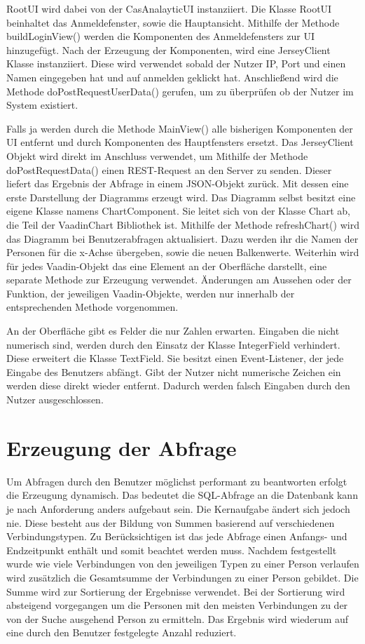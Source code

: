 RootUI wird dabei von der CasAnalayticUI instanziiert. Die Klasse RootUI beinhaltet das Anmeldefenster, sowie die Hauptansicht. Mithilfe der Methode buildLoginView() werden die Komponenten des Anmeldefensters zur UI hinzugefügt. Nach der Erzeugung der Komponenten, wird eine JerseyClient Klasse instanziiert. Diese wird verwendet sobald der Nutzer IP, Port und einen Namen eingegeben hat und auf anmelden geklickt hat. Anschließend wird die Methode doPostRequestUserData() gerufen, um zu überprüfen ob der Nutzer im System existiert. 

Falls ja werden durch die Methode MainView() alle bisherigen Komponenten der UI entfernt und durch Komponenten des Hauptfensters ersetzt. Das JerseyClient Objekt wird direkt im Anschluss verwendet, um Mithilfe der Methode doPostRequestData() einen REST-Request an den Server zu senden. Dieser liefert das Ergebnis der Abfrage in einem JSON-Objekt zurück. Mit dessen eine erste Darstellung der Diagramms erzeugt wird. Das Diagramm selbst besitzt eine eigene Klasse namens ChartComponent. Sie leitet sich von der Klasse Chart ab, die Teil der VaadinChart Bibliothek ist. Mithilfe der Methode refreshChart() wird das Diagramm bei Benutzerabfragen aktualisiert. Dazu werden ihr die Namen der Personen für die x-Achse übergeben, sowie die neuen Balkenwerte. Weiterhin wird für jedes Vaadin-Objekt das eine Element an der Oberfläche darstellt, eine separate Methode zur Erzeugung verwendet. Änderungen am Aussehen oder der Funktion, der jeweiligen Vaadin-Objekte, werden nur innerhalb der entsprechenden Methode vorgenommen.

An der Oberfläche gibt es Felder die nur Zahlen erwarten. Eingaben die nicht numerisch sind, werden durch den Einsatz der Klasse IntegerField verhindert. Diese erweitert die Klasse TextField. Sie besitzt einen Event-Listener, der jede Eingabe des Benutzers abfängt. Gibt der Nutzer nicht numerische Zeichen ein werden diese direkt wieder entfernt. Dadurch werden falsch Eingaben durch den Nutzer ausgeschlossen.

\section{Erzeugung der Abfrage}

Um Abfragen durch den Benutzer möglichst performant zu beantworten erfolgt die Erzeugung dynamisch. Das bedeutet die SQL-Abfrage an die Datenbank kann je nach Anforderung anders aufgebaut sein. Die Kernaufgabe ändert sich jedoch nie. Diese besteht aus der Bildung von Summen basierend auf verschiedenen Verbindungstypen. Zu Berücksichtigen ist das jede Abfrage einen Anfangs- und Endzeitpunkt enthält und somit beachtet werden muss. Nachdem festgestellt wurde wie viele Verbindungen von den jeweiligen Typen zu einer Person verlaufen wird zusätzlich die Gesamtsumme der Verbindungen zu einer Person gebildet. Die Summe wird zur Sortierung der Ergebnisse verwendet. Bei der Sortierung wird absteigend vorgegangen um die Personen mit den meisten Verbindungen zu der von der Suche ausgehend Person zu ermitteln. Das Ergebnis wird wiederum auf eine durch den Benutzer festgelegte Anzahl reduziert. 

